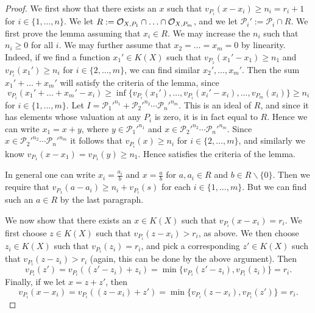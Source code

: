     \begin{proof}
    We first show that there exists an $x$ such that $v_{P_i}(x- x_i) \geq n_i = r_i +1$ for $i \in \{1, \ldots, n\}$.
    We let $R:= {\cal O}_{X,P_1} \cap \ldots \cap {\cal O}_{X,P_m}$, and we let $\mathcal{P}_i' := \mathcal{P}_i \cap R$.
    We first prove the lemma assuming that $x_i \in R$.
    We may increase the $n_i$ such that $n_i\geq 0$ for all $i$.
    We may further assume that $x_2 = \ldots = x_m =0$ by linearity.
    Indeed, if we find a function $x_1' \in K(X)$ such that $v_{P_1}(x_1' - x_1) \geq n_1$ and $v_{P_i}(x_1') \geq n_i$ for $i \in \{2, \ldots, m\}$, we can find similar $x_2', \ldots, x_m'$.
    Then the sum $x_1' + \ldots + x_m'$  will satisfy the criteria of the lemma, since
        \[
        v_{P_i}(x_1' + \ldots + x_m' - x_i) \geq \inf\{v_{P_i}(x_1'), \ldots,  v_{P_i}(x_i' - x_i), \ldots, v_{P_m}(x_i)\} \geq n_i
        \]  
    for $i \in \{1, \ldots, m\}$.
    Let $I = {\mathcal{P}_1'}^{n_1} + {\mathcal{P}_2'}^{n_2}\cdots {\mathcal{P}_n'}^{n_m}$.
    This is an ideal of $R$, and since it has elements whose valuation at any $P_i$ is zero, it is in fact equal to $R$.
    Hence we can write $x_1 = x + y$, where $y \in {\mathcal{P}_1'}^{n_1}$ and $x\in {\mathcal{P}_2'}^{n_2}\cdots {\mathcal{P}_n'}^{n_m}$.
    Since $x\in {\mathcal{P}_2'}^{n_2}\cdots {\mathcal{P}_n'}^{n_m}$ it follows that $v_{P_i}(x) \geq n_i$ for $i \in \{2, \ldots, m\}$, and similarly we know $v_{P_1}(x - x_1) = v_{P_1}(y) \geq n_1$.
    Hence satisfies the criteria of the lemma.
    
    In general one can write $x_i = \frac{a_i}{b}$ and $x = \frac{a}{b}$ for $a,a_i\in R$ and $b\in R\backslash \{0\}$.
    Then we require that $v_{P_1}(a-a_i) \geq n_i + v_{P_i}(s)$ for each $i \in \{1, \ldots, m\}$.
    But we can find such an $a \in R$ by the last paragraph.

    We now show that there exists an $x \in K(X)$ such that $v_{P_i}(x - x_i) = r_i$.
    We first choose $z \in K(X)$ such that $v_{P_i}(z - x_i) > r_i$, as above.
    We then choose $z_i \in K(X)$ such that $v_{P_i}(z_i) = r_i$, and pick a corresponding $z' \in K(X)$ such that $v_{P_i}(z - z_i) > r_i$ (again, this can be done by the above argument).
    Then
        \[
        v_{P_i}(z') = v_{P_i}((z'-z_i) + z_i) = \min\{v_{P_i}(z'-z_i),v_{P_i}(z_i)\} = r_i.
        \]
    Finally, if we let $x = z + z'$, then
        \[
        v_{P_i}(x - x_i) = v_{P_i}((z-x_i) + z') = \min\{v_{P_i}(z - x_i), v_{P_i}(z')\} = r_i.
        \]  
    \end{proof}

